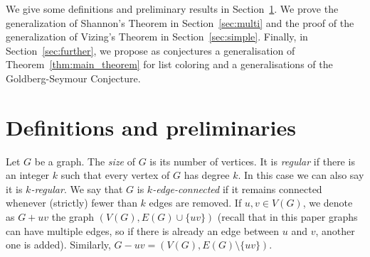 \documentclass[11pt]{article}
\newcommand{\PA}[1]{{\color{blue}{\bf PA:} #1}}
\begin{document}
We give some definitions and preliminary results in Section~\ref{sec:intro}. We prove the generalization of Shannon's Theorem in Section~\ref{sec:multi} and the proof of the generalization of Vizing's Theorem in Section~\ref{sec:simple}. Finally, in Section~\ref{sec:further}, we propose as  conjectures a generalisation of Theorem~\ref{thm:main_theorem} for list coloring and a generalisations of the Goldberg-Seymour Conjecture.
\medskip


\section{Definitions and preliminaries} \label{sec:intro}
Let $G$ be a graph. 
The \emph{size} of $G$ is its number of vertices. It is \textit{regular} if there is an integer $k$ such that every vertex of $G$ has degree $k$. In this case we can also say it is \textit{$k$-regular}. 
We say that $G$ is \emph{$k$-edge-connected} if it remains connected whenever (strictly) fewer than $k$ edges are removed. 
If $u, v \in V(G)$, we denote as $G + uv$ the graph $(V(G), E(G) \cup \{ uv \})$ (recall that in this paper graphs can have multiple edges, so if there is already an edge between $u$ and $v$, another one is added). Similarly, $G - uv = (V(G), E(G) \setminus \{ uv \})$.
\end{document}
